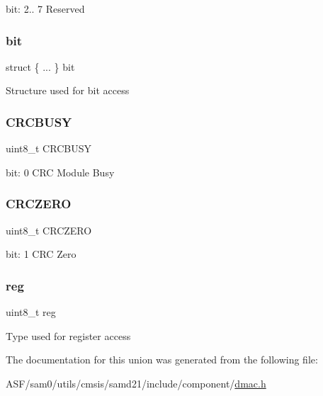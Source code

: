 bit\+: 2.. 7 Reserved \mbox{\label{union_d_m_a_c___c_r_c_s_t_a_t_u_s___type_ada1e90869cb34f733223ef5b44bf25ba}} 
\subsubsection{\texorpdfstring{bit}{bit}}
{\footnotesize\ttfamily struct \{ ... \}   bit}

Structure used for bit access \mbox{\label{union_d_m_a_c___c_r_c_s_t_a_t_u_s___type_a5227891b8e080651b741ba2d9c40263d}} 
\subsubsection{\texorpdfstring{CRCBUSY}{CRCBUSY}}
{\footnotesize\ttfamily uint8\+\_\+t C\+R\+C\+B\+U\+SY}

bit\+: 0 C\+RC Module Busy \mbox{\label{union_d_m_a_c___c_r_c_s_t_a_t_u_s___type_a2fa8c53a85d3677fc7f208bfd742e74c}} 
\subsubsection{\texorpdfstring{CRCZERO}{CRCZERO}}
{\footnotesize\ttfamily uint8\+\_\+t C\+R\+C\+Z\+E\+RO}

bit\+: 1 C\+RC Zero \mbox{\label{union_d_m_a_c___c_r_c_s_t_a_t_u_s___type_a9428adc9af4653a2050e2536b55dec8d}} 
\subsubsection{\texorpdfstring{reg}{reg}}
{\footnotesize\ttfamily uint8\+\_\+t reg}

Type used for register access 

The documentation for this union was generated from the following file\+:\begin{DoxyCompactItemize}
\item 
A\+S\+F/sam0/utils/cmsis/samd21/include/component/\mbox{\hyperlink{component_2dmac_8h}{dmac.\+h}}\end{DoxyCompactItemize}
